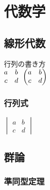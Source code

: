 \documentclass[11pt,a4j]{jreport}
\begin{document}
\chapter{代数学}
\thispagestyle{fancy}
\section{線形代数}
行列の書き方\\
$
\begin{matrix}
    a & b \\
    c & d
\end{matrix}\\
\begin{pmatrix}
    a & b \\
    c & d
\end{pmatrix}\\
$
\subsection{行列式}
$
\begin{vmatrix}
    a & b \\
    c & d
\end{vmatrix}
$

\section{群論}
\subsection{準同型定理}
\end{document}
